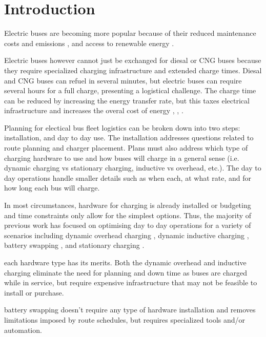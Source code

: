\section{Introduction}
\par  Electric buses are becoming more popular because of their reduced maintenance costs \cite{poornesh_comparative_2020} and emissions \cite{kato_comparative_2013}, and access to renewable energy \cite{cheng_smart_2020}.
\par  Electric buses however cannot just be exchanged for diesal or CNG buses because they require specialized charging infrastructure and extended charge times. Diesal and CNG buses can refuel in several minutes, but electric buses can require several hours for a full charge, presenting a logistical challenge. The charge time can be reduced by increasing the energy transfer rate, but this taxes electrical infrastructure and increases the overal cost of energy \cite{stahleder_impact_2019}, \cite{deb_impact_2017}, \cite{boonraksa_impact_2019}.
\par Planning for electical bus fleet logistics can be broken down into two steps: installation, and day to day use. The installation addresses questions related to route planning and charger placement. Plans must also address which type of charging hardware to use and how buses will charge in a general sense (i.e. dynamic charging vs stationary charging, inductive vs overhead, etc.). The day to day operations handle smaller details such as when each, at what rate, and for how long each bus will charge.  
\par In most circumstances, hardware for charging is already installed or budgeting and time constraints only allow for the simplest options. Thus, the majority of previous work has focused on optimising day to day operations for a variety of scenarios including dynamic overhead charging \cite{csonka_optimization_2021}, dynamic inductive charging \cite{jeong_automatic_2018} \cite{balde_electric_2019}, battery swapping \cite{jain_battery_2020} \cite{xian_zhang_optimal_2016}, and stationary charging \cite{whitaker_network_nodate}.
\par each hardware type has its merits. Both the dynamic overhead and inductive charging eliminate the need for planning and down time as buses are charged while in service, but require expensive infrastructure that may not be feasible to install or purchase.
\par battery swapping doesn't require any type of hardware installation and removes limitations imposed by route schedules, but requires specialized tools and/or automation.
